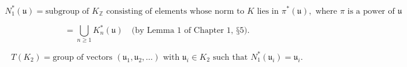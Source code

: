 $$N_1^*(\mathfrak{u}) = \text{subgroup of } K_{\mathbb{Z}} \text{ consisting of elements whose norm to } K \text{ lies in } \pi^*(\mathfrak{u}), \text{ where } \pi \text{ is a power of } \mathfrak{u}$$

$$= \bigcup_{n \geq 1} K_n^*(\mathfrak{u}) \quad \text{(by Lemma 1 of Chapter 1, §5)}.$$

$$T(K_2) = \text{group of vectors } (\mathfrak{u}_1, \mathfrak{u}_2, \dots) \text{ with } \mathfrak{u}_i \in K_2 \text{ such that } N_1^*(\mathfrak{u}_i) = \mathfrak{u}_i.$$
